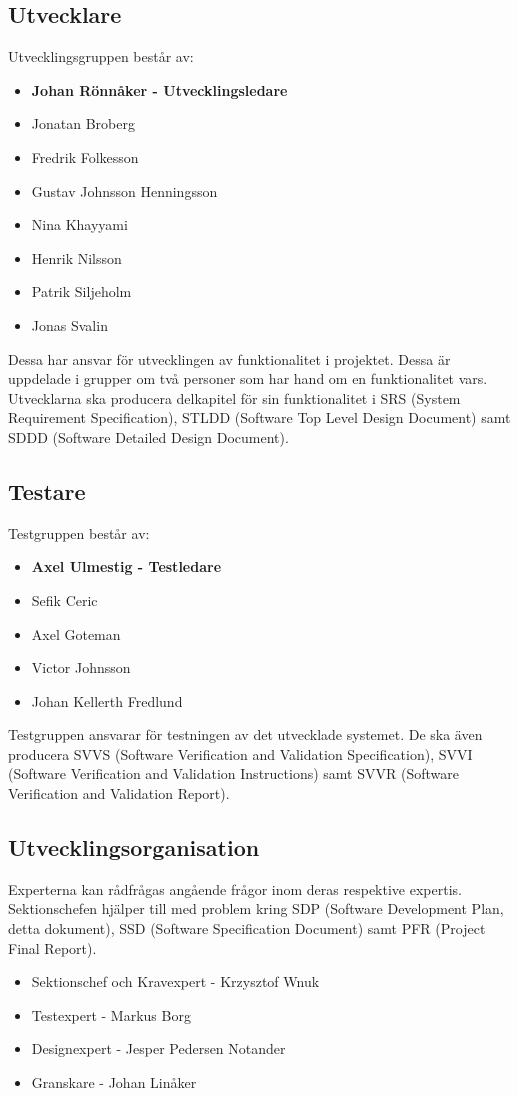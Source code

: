 ﻿\documentclass[a4paper]{article}
\begin{document}
\subsection{Utvecklare}
Utvecklingsgruppen består av:
\begin{itemize}
\item{{\bf Johan Rönnåker - Utvecklingsledare}}
\item{Jonatan Broberg}
\item{Fredrik Folkesson}
\item{Gustav Johnsson Henningsson}
\item{Nina Khayyami}
\item{Henrik Nilsson}
\item{Patrik Siljeholm}
\item{Jonas Svalin}
\end{itemize}

Dessa har ansvar för utvecklingen av funktionalitet i projektet. Dessa är uppdelade i grupper om två personer som har hand om en funktionalitet vars. Utvecklarna ska producera delkapitel för sin funktionalitet i SRS (System Requirement Specification), STLDD (Software Top Level Design Document) samt SDDD (Software Detailed Design Document).

\subsection{Testare}
Testgruppen består av:
\begin{itemize}
\item{{\bf Axel Ulmestig - Testledare}}
\item{Sefik Ceric}
\item{Axel Goteman}
\item{Victor Johnsson}
\item{Johan Kellerth Fredlund}

\end{itemize}

Testgruppen ansvarar för testningen av det utvecklade systemet. De ska även producera SVVS (Software Verification and Validation Specification), SVVI (Software Verification and Validation Instructions) samt SVVR (Software Verification and Validation Report).

\subsection{Utvecklingsorganisation}
Experterna kan rådfrågas angående frågor inom deras respektive expertis. Sektionschefen hjälper till med problem kring SDP (Software Development Plan, detta dokument), SSD (Software Specification Document) samt PFR (Project Final Report).
\begin{itemize}
\item{Sektionschef och Kravexpert - Krzysztof Wnuk}
\item{Testexpert - Markus Borg}
\item{Designexpert - Jesper Pedersen Notander}
\item{Granskare - Johan Linåker}
\end{itemize}
\end{document}
